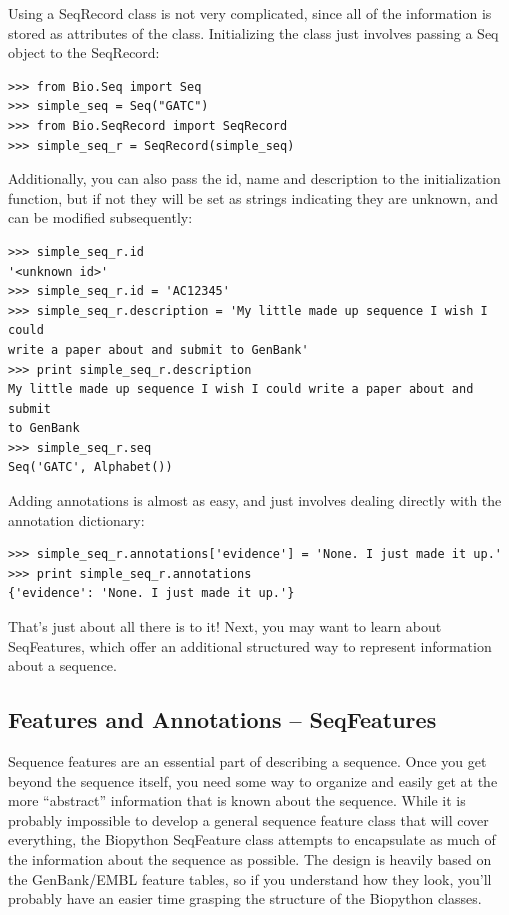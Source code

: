 \documentclass{report}
\begin{document}
Using a SeqRecord class is not very complicated, since all of the information is stored as attributes of the class. Initializing the class just involves passing a Seq object to the SeqRecord:

\begin{verbatim}
>>> from Bio.Seq import Seq
>>> simple_seq = Seq("GATC")
>>> from Bio.SeqRecord import SeqRecord
>>> simple_seq_r = SeqRecord(simple_seq)
\end{verbatim}

Additionally, you can also pass the id, name and description to the initialization function, but if not they will be set as strings indicating they are unknown, and can be modified subsequently:

\begin{verbatim}
>>> simple_seq_r.id
'<unknown id>'
>>> simple_seq_r.id = 'AC12345'
>>> simple_seq_r.description = 'My little made up sequence I wish I could 
write a paper about and submit to GenBank'
>>> print simple_seq_r.description
My little made up sequence I wish I could write a paper about and submit 
to GenBank
>>> simple_seq_r.seq
Seq('GATC', Alphabet())
\end{verbatim}

Adding annotations is almost as easy, and just involves dealing directly with the annotation dictionary:

\begin{verbatim}
>>> simple_seq_r.annotations['evidence'] = 'None. I just made it up.'
>>> print simple_seq_r.annotations
{'evidence': 'None. I just made it up.'}
\end{verbatim}

That's just about all there is to it! Next, you may want to learn about SeqFeatures, which offer an additional structured way to represent information about a sequence.

\subsection{Features and Annotations -- SeqFeatures}
\label{sec:seq_features}

Sequence features are an essential part of describing a sequence. Once you get beyond the sequence itself, you need some way to organize and easily get at the more ``abstract'' information that is known about the sequence. While it is probably impossible to develop a general sequence feature class that will cover everything, the Biopython SeqFeature class attempts to encapsulate as much of the information about the sequence as possible. The design is heavily based on the GenBank/EMBL feature tables, so if you understand how they look, you'll probably have an easier time grasping the structure of the Biopython classes.
\end{document}
